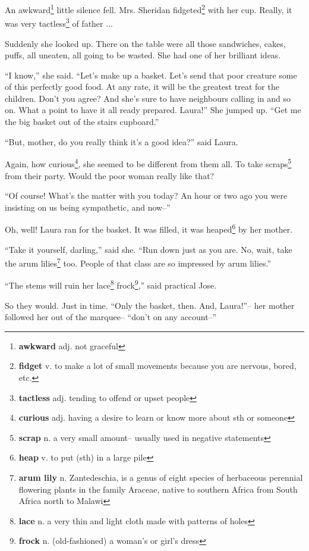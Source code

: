 An awkward\footnote{\textbf{awkward} adj. not graceful} little silence fell. Mrs. Sheridan fidgeted\footnote{\textbf{fidget} v. to make a lot of small movements because you are nervous, bored, etc.} with her cup. Really, it was very tactless\footnote{\textbf{tactless} adj. tending to offend or upset people} of father ...

Suddenly she looked up. There on the table were all those sandwiches, cakes, puffs, all uneaten, all going to be wasted. She had one of her brilliant ideas.

``I know,'' she said. ``Let's make up a basket. Let's send that poor creature some of this perfectly good food. At any rate, it will be the greatest treat for the children. Don't you agree? And she's sure to have neighbours calling in and so on. What a point to have it all ready prepared. Laura!'' She jumped up. ``Get me the big basket out of the stairs cupboard.''

``But, mother, do you really think it's a good idea?'' said Laura.

Again, how curious\footnote{\textbf{curious} adj. having a desire to learn or know more about sth or someone}, she seemed to be different from them all. To take scraps\footnote{\textbf{scrap} n. a very small amount-- usually used in negative statements} from their party. Would the poor woman really like that?

``Of course! What's the matter with you today? An hour or two ago you were insisting on us being sympathetic, and now--''

Oh, well! Laura ran for the basket. It was filled, it was heaped\footnote{\textbf{heap} v. to put (sth) in a large pile} by her mother.

``Take it yourself, darling,'' said she. ``Run down just as you are. No, wait, take the arum lilies\footnote{\textbf{arum lily} n. Zantedeschia,  is a genus of eight species of herbaceous perennial flowering plants in the family Araceae, native to southern Africa from South Africa north to Malawi} too. People of that class are so impressed by arum lilies.''

``The stems will ruin her lace\footnote{\textbf{lace} n. a very thin and light cloth made with patterns of holes} frock\footnote{\textbf{frock} n. (old-fashioned) a woman's or girl's dress},'' said practical Jose.

So they would. Just in time. ``Only the basket, then. And, Laura!''-- her mother followed her out of the marquee-- ``don't on any account--''

